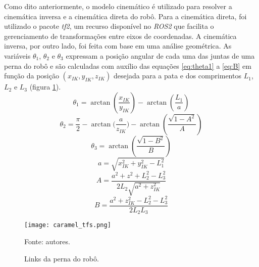 \documentclass[conference]{IEEEtran}
\begin{document}
Como dito anteriormente, o modelo cinemático é utilizado para resolver a cinemática inversa e a cinemática direta do robô. Para a cinemática direta, foi utilizado o pacote \textit{tf2}, um recurso disponível no \textit{ROS2} que facilita o gerenciamento de transformações entre eixos de coordenadas. A cinemática inversa, por outro lado, foi feita com base em uma análise geométrica. As variáveis $\theta_1$, $\theta_2$ e $\theta_3$ expressam a posição angular de cada uma das juntas de uma perna do robô e são calculadas com auxílio das equações \ref{eq:theta1} a \ref{eq:B} em função da posição $(x_{IK}, y_{IK}, z_{IK})$ desejada para a pata e dos comprimentos $L_1$, $L_2$ e $L_3$ (figura \ref{fig:caramel_tfs}).
\begin{equation}
  \label{eq:theta1}
  \theta_1 = \arctan{(\frac{x_{IK}}{y_{IK}})} - \arctan{(\frac{L_1}{a})}
\end{equation}
\begin{equation}
  \label{eq:theta2}
  \theta_2 = \frac{\pi}{2} - \arctan{(\frac{a}{z_{IK}}}) - \arctan{(\frac{\sqrt{1-A^2}}{A})}
\end{equation}
\begin{equation}
  \label{eq:theta3}
  \theta_3 = \arctan(\frac{\sqrt{1-B^2}}{B})
\end{equation}
\begin{equation}
  \label{eq:a}
  a = \sqrt{x_{IK}^2+y_{IK}^2-L_1^2}
\end{equation}
\begin{equation}
  \label{eq:A}
  A =\frac{a^2+z^2+L_2^2-L_3^2}{2L_2\sqrt{a^2+z_{IK}^2}}
\end{equation}
\begin{equation}
  \label{eq:B}
  B = \frac{a^2+z_{IK}^2-L_2^2-L_3^2}{2L_2L_3}
\end{equation}

\begin{figure}[htbp]
  \centering
  \texttt{[image: caramel\_tfs.png]}

  \caption{Links da perna do robô.}
  Fonte: autores.
  \label{fig:caramel_tfs}
\end{figure}
\end{document}
